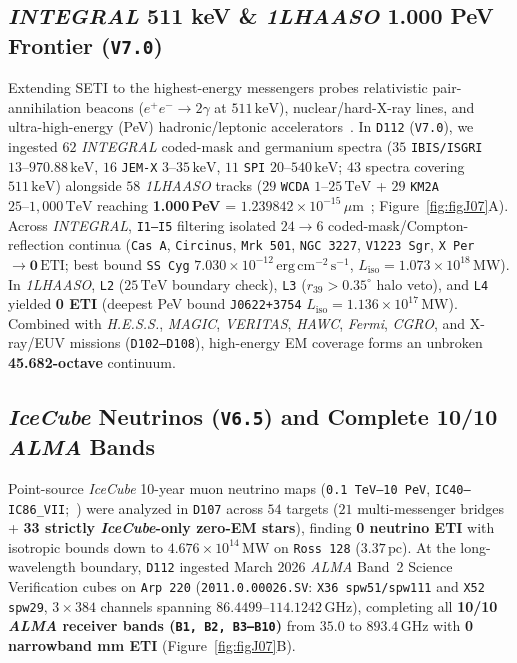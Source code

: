 \documentclass[twocolumn,10pt]{article}
\begin{document}
\subsection{\textit{INTEGRAL} 511 keV \& \textit{1LHAASO} 1.000 PeV Frontier (\texttt{V7.0})}
Extending SETI to the highest-energy messengers probes relativistic pair-annihilation beacons ($e^+e^- \rightarrow 2\gamma$ at $511\,\mathrm{keV}$), nuclear/hard-X-ray lines, and ultra-high-energy (PeV) hadronic/leptonic accelerators~\cite{Harris1986,Lacki2015}. In \texttt{D112} (\texttt{V7.0}), we ingested $62$ \textit{INTEGRAL} coded-mask and germanium spectra ($35$ \texttt{IBIS/ISGRI} $13\text{--}970.88\,\mathrm{keV}$, $16$ \texttt{JEM-X} $3\text{--}35\,\mathrm{keV}$, $11$ \texttt{SPI} $20\text{--}540\,\mathrm{keV}$; $43$ spectra covering $511\,\mathrm{keV}$) alongside $58$ \textit{1LHAASO} tracks ($29$ \texttt{WCDA} $1\text{--}25\,\mathrm{TeV}$ + $29$ \texttt{KM2A} $25\text{--}1{,}000\,\mathrm{TeV}$ reaching \textbf{1.000\,PeV} = $1.239842\times 10^{-15}\,\mu\text{m}$~\cite{Winkler2003,Cao2024}; Figure~\ref{fig:figJ07}A). Across \textit{INTEGRAL}, \texttt{I1--I5} filtering isolated $24 \rightarrow 6$ coded-mask/Compton-reflection continua (\texttt{Cas\,A}, \texttt{Circinus}, \texttt{Mrk\,501}, \texttt{NGC\,3227}, \texttt{V1223\,Sgr}, \texttt{X\,Per} $\rightarrow \mathbf{0\,\mathrm{ETI}}$; best bound \texttt{SS\,Cyg} $7.030\times 10^{-12}\,\mathrm{erg\,cm^{-2}\,s^{-1}}$, $L_{\mathrm{iso}} = 1.073\times 10^{18}\,\mathrm{MW}$). In \textit{1LHAASO}, \texttt{L2} ($25\,\mathrm{TeV}$ boundary check), \texttt{L3} ($r_{39}>0.35^\circ$ halo veto), and \texttt{L4} yielded \textbf{0 ETI} (deepest PeV bound \texttt{J0622+3754} $L_{\mathrm{iso}} = 1.136\times 10^{17}\,\mathrm{MW}$). Combined with \textit{H.E.S.S.}, \textit{MAGIC}, \textit{VERITAS}, \textit{HAWC}, \textit{Fermi}, \textit{CGRO}, and X-ray/EUV missions (\texttt{D102--D108}), high-energy EM coverage forms an unbroken \textbf{45.682-octave} continuum.

\subsection{\textit{IceCube} Neutrinos (\texttt{V6.5}) and Complete 10/10 \textit{ALMA} Bands}
Point-source \textit{IceCube} 10-year muon neutrino maps (\texttt{0.1 TeV--10 PeV}, \texttt{IC40--IC86\_VII};~\cite{IceCube10YrData,Abbasi2022}) were analyzed in \texttt{D107} across $54$ targets ($21$ multi-messenger bridges + \textbf{33 strictly \textit{IceCube}-only zero-EM stars}), finding \textbf{0 neutrino ETI} with isotropic bounds down to $4.676\times 10^{14}\,\mathrm{MW}$ on \texttt{Ross\,128} ($3.37\,\mathrm{pc}$). At the long-wavelength boundary, \texttt{D112} ingested March 2026 \textit{ALMA} Band~2 Science Verification cubes on \texttt{Arp\,220} (\texttt{2011.0.00026.SV}: \texttt{X36 spw51/spw111} and \texttt{X52 spw29}, $3 \times 384$ channels spanning $86.4499\text{--}114.1242\,\mathrm{GHz}$), completing all \textbf{10/10 \textit{ALMA} receiver bands (\texttt{B1, B2, B3--B10})} from $35.0$ to $893.4\,\mathrm{GHz}$ with \textbf{0 narrowband mm ETI} (Figure~\ref{fig:figJ07}B).
\end{document}

